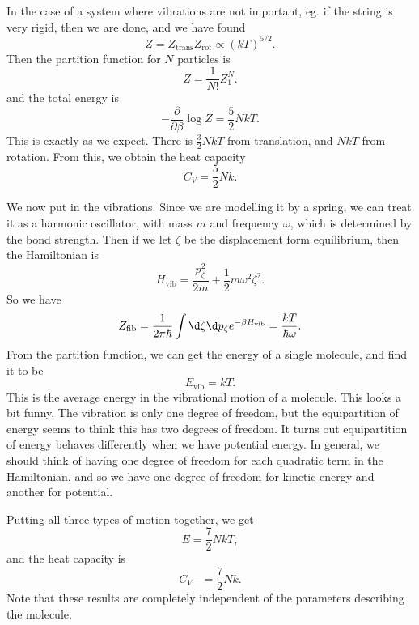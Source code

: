 \documentclass[a4paper]{article}
\begin{document}
\begin{eg}
  In the case of a system where vibrations are not important, eg. if the string is very rigid, then we are done, and we have found
  \[
    Z = Z_{\mathrm{trans}} Z_{\mathrm{rot}} \propto (kT)^{5/2}.
  \]
  Then the partition function for $N$ particles is
  \[
    Z = \frac{1}{N!} Z_1^N.
  \]
  and the total energy is
  \[
    -\frac{\partial}{\partial \beta} \log Z = \frac{5}{2} NkT.
  \]
  This is exactly as we expect. There is $\frac{3}{2}NkT$ from translation, and $NkT$ from rotation. From this, we obtain the heat capacity
  \[
    C_V = \frac{5}{2} Nk.
  \]
\end{eg}
We now put in the vibrations. Since we are modelling it by a spring, we can treat it as a harmonic oscillator, with mass $m$ and frequency $\omega$, which is determined by the bond strength. Then if we let $\zeta$ be the displacement form equilibrium, then the Hamiltonian is
\[
  H_{\mathrm{vib}} = \frac{p_\zeta^2}{2m} + \frac{1}{2}m \omega^2 \zeta^2.
\]
So we have
\[
  Z_{\mathrm{fib}} = \frac{1}{2\pi \hbar} \int \d \zeta \d p_\zeta e^{-\beta H_{\mathrm{vib}}} = \frac{kT}{\hbar \omega}.
\]
From the partition function, we can get the energy of a single molecule, and find it to be
\[
  E_{\mathrm{vib}} = kT.
\]
This is the average energy in the vibrational motion of a molecule. This looks a bit funny. The vibration is only one degree of freedom, but the equipartition of energy seems to think this has two degrees of freedom. It turns out equipartition of energy behaves differently when we have potential energy. In general, we should think of having one degree of freedom for each quadratic term in the Hamiltonian, and so we have one degree of freedom for kinetic energy and another for potential.

Putting all three types of motion together, we get
\[
  E = \frac{7}{2} NkT,
\]
and the heat capacity is
\[
  C_V- = \frac{7}{2}Nk.
\]
Note that these results are completely independent of the parameters describing the molecule.
\end{document}
